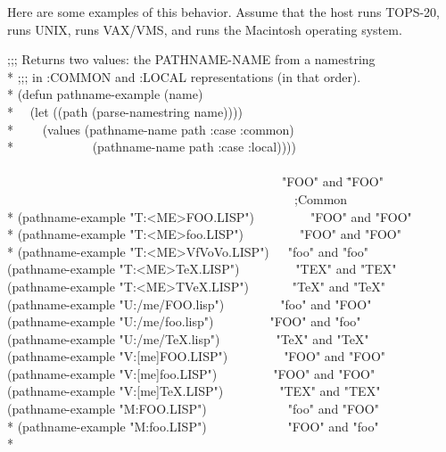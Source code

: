 \begin{newer}
\newpage%

Here are some examples of this behavior.  Assume that the host  runs
TOPS-20,  runs UNIX,  runs VAX/VMS, and  runs the Macintosh
operating system.
\begin{lisp}
;;; Returns two values: the PATHNAME-NAME from a namestring \\*
;;; in :COMMON and :LOCAL representations (in that order). \\*
(defun pathname-example (name) \\*
~~(let ((path (parse-namestring name)))) \\*
~~~~(values (pathname-name path :case :common) \\*
~~~~~~~~~~~~(pathname-name path :case :local)))) \\
\\
~~~~~~~~~~~~~~~~~~~~~~~~~~~~~~~~~~~~~~~~~~~\EV\ "FOO" {\rm and} \="FOO" \kill
~~~~~~~~~~~~~~~~~~~~~~~~~~~~~~~~~~~~~~~~~~~~~~;{\rm Common} \\*
(pathname-example "T:<ME>FOO.LISP")~~~~~~~~\EV\ "FOO" {\rm and} "FOO" \\*
(pathname-example "T:<ME>foo.LISP")~~~~~~~~\EV\ "FOO" {\rm and} "FOO" \\*
(pathname-example "T:<ME>{\Xcircumflex}Vf{\Xcircumflex}Vo{\Xcircumflex}Vo.LISP")~~\EV\ "foo" {\rm and} "foo" \\
(pathname-example "T:<ME>TeX.LISP")~~~~~~~~\EV\ "TEX" {\rm and} "TEX" \\
(pathname-example "T:<ME>T{\Xcircumflex}VeX.LISP")~~~~~~\EV\ "TeX" {\rm and} "TeX" \\
(pathname-example "U:/me/FOO.lisp")~~~~~~~~\EV\ "foo" {\rm and} "FOO" \\
(pathname-example "U:/me/foo.lisp")~~~~~~~~\EV\ "FOO" {\rm and} "foo" \\
(pathname-example "U:/me/TeX.lisp")~~~~~~~~\EV\ "TeX" {\rm and} "TeX" \\
(pathname-example "V:[me]FOO.LISP")~~~~~~~~\EV\ "FOO" {\rm and} "FOO" \\
(pathname-example "V:[me]foo.LISP")~~~~~~~~\EV\ "FOO" {\rm and} "FOO" \\
(pathname-example "V:[me]TeX.LISP")~~~~~~~~\EV\ "TEX" {\rm and} "TEX" \\
(pathname-example "M:FOO.LISP")~~~~~~~~~~~~\EV\ "foo" {\rm and} "FOO" \\*
(pathname-example "M:foo.LISP")~~~~~~~~~~~~\EV\ "FOO" {\rm and} "foo" \\*

\end{lisp}
\end{newer}
